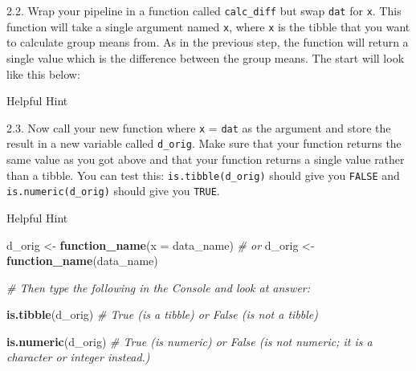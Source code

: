 \documentclass[]{book}
\newenvironment{Shaded}{\begin{snugshade}}{\end{snugshade}}
\newcommand{\CommentTok}[1]{\textcolor[rgb]{0.56,0.35,0.01}{\textit{#1}}}
\newcommand{\ControlFlowTok}[1]{\textcolor[rgb]{0.13,0.29,0.53}{\textbf{#1}}}
\newcommand{\DataTypeTok}[1]{\textcolor[rgb]{0.13,0.29,0.53}{#1}}
\newcommand{\KeywordTok}[1]{\textcolor[rgb]{0.13,0.29,0.53}{\textbf{#1}}}
\newcommand{\NormalTok}[1]{#1}
\newcommand{\OperatorTok}[1]{\textcolor[rgb]{0.81,0.36,0.00}{\textbf{#1}}}
\newcommand{\StringTok}[1]{\textcolor[rgb]{0.31,0.60,0.02}{#1}}
\begin{document}
2.2. Wrap your pipeline in a function called \texttt{calc\_diff} but swap \texttt{dat} for \texttt{x}. This function will take a single argument named \texttt{x}, where \texttt{x} is the tibble that you want to calculate group means from. As in the previous step, the function will return a single value which is the difference between the group means. The start will look like this below:

\begin{Shaded}
\end{Shaded}

Helpful Hint

\begin{Shaded}
\end{Shaded}

2.3. Now call your new function where \texttt{x} = \texttt{dat} as the argument and store the result in a new variable called \texttt{d\_orig}. Make sure that your function returns the same value as you got above and that your function returns a single value rather than a tibble. You can test this: \texttt{is.tibble(d\_orig)} should give you \texttt{FALSE} and \texttt{is.numeric(d\_orig)} should give you \texttt{TRUE}.

Helpful Hint

\begin{Shaded}
\begin{Highlighting}[]
\NormalTok{d_orig <-}\StringTok{ }\KeywordTok{function_name}\NormalTok{(}\DataTypeTok{x =}\NormalTok{ data_name) }
\CommentTok{# or}
\NormalTok{d_orig <-}\StringTok{ }\KeywordTok{function_name}\NormalTok{(data_name)}

\CommentTok{# Then type the following in the Console and look at answer:}

\KeywordTok{is.tibble}\NormalTok{(d_orig)}
\CommentTok{# True (is a tibble) or False (is not a tibble)}

\KeywordTok{is.numeric}\NormalTok{(d_orig)}
\CommentTok{# True (is numeric) or False (is not numeric; it is a character or integer instead.)}
\end{Highlighting}
\end{Shaded}
\end{document}
